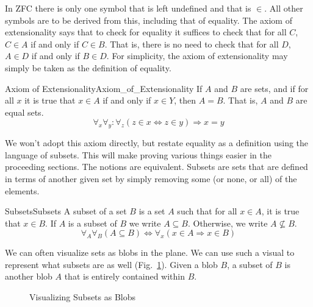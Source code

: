         In ZFC there is only one symbol that is left undefined and that is
        $\in$. All other symbols are to be derived from this, including that of
        equality. The axiom of extensionality says that to check for equality it
        suffices to check that for all $C$, $C\in{A}$ if and only if $C\in{B}$.
        That is, there is no need to check that for all $D$, $A\in{D}$ if and
        only if $B\in{D}$. For simplicity, the axiom of extensionality may
        simply be taken as the definition of equality.
        \begin{faxiom}{Axiom of Extensionality}{Axiom_of_Extensionality}
            If $A$ and $B$ are sets, and if for all $x$ it is true that
            $x\in{A}$ if and only if $x\in{Y}$, then $A=B$. That is, $A$ and $B$
            are equal sets.
            \begin{equation*}
                \forall_{x}\forall_{y}:\forall_{z}(z\in{x}\Leftrightarrow
                z\in{y})\Rightarrow{x}=y
            \end{equation*}
        \end{faxiom}
        We won't adopt this axiom directly, but restate equality as a definition
        using the language of subsets. This will make proving
        various things easier in the proceeding sections. The notions are
        equivalent. Subsets are sets that are defined in terms of another given
        set by simply removing some (or none, or all) of the elements.
        \begin{fdefinition}{Subsets}{Subsets}
            A \gls{subset} of a \gls{set} $B$ is a set $A$ such that for all
            $x\in{A}$, it is true that $x\in{B}$. If $A$ is a subset of $B$ we
            write $A\subseteq{B}$. Otherwise, we write $A\nsubseteq{B}$.
            \begin{equation*}
                \forall_{A}\forall_{B}(A\subseteq{B})
                \Leftrightarrow
                \forall_{x}(x\in{A}\Rightarrow{x}\in{B})
            \end{equation*}
        \end{fdefinition}
        We can often visualize sets as blobs in the plane. We can use such a
        visual to represent what subsets are as well
        (Fig.~\ref{fig:Subset_Blobs}). Given a blob $B$, a subset of $B$ is
        another blob $A$ that is entirely contained within $B$.
        \begin{figure}[H]
            \centering
            
            \caption{Visualizing Subsets as Blobs}
            \label{fig:Subset_Blobs}
        \end{figure}
